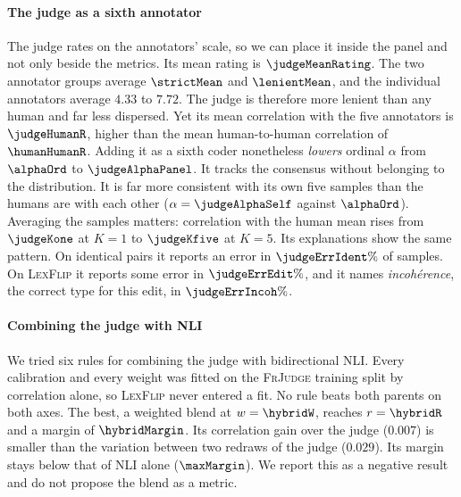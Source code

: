 \documentclass{BVP_JCLLT}
\newcommand{\rev}[1]{#1}
\newcommand{\rev}[1]{{\color{revcol}#1}}
\begin{document}
{\paragraph{The judge as a sixth annotator}
The judge rates on the annotators' scale, so we can place it inside the panel
and not only beside the metrics. Its mean rating is $\judgeMeanRating$. \rev{The two annotator groups average $\strictMean$ and
$\lenientMean$, and the individual annotators average $4.33$ to $7.72$. The
judge is therefore more lenient than any human and far less dispersed.} Yet its mean correlation with the five
annotators is $\judgeHumanR$, higher than the mean human-to-human correlation
of $\humanHumanR$. Adding it as a sixth coder nonetheless \emph{lowers} ordinal
$\alpha$ from $\alphaOrd$ to $\judgeAlphaPanel$. It tracks the consensus without
belonging to the distribution. It is far more consistent with its own five
samples than the humans are with each other ($\alpha=\judgeAlphaSelf$ against
$\alphaOrd$). Averaging the samples matters: correlation with the human mean
rises from $\judgeKone$ at $K=1$ to $\judgeKfive$ at $K=5$. Its explanations
show the same pattern. On identical pairs it reports an error in
$\judgeErrIdent\%$ of samples. On \textsc{LexFlip} it reports some error in
$\judgeErrEdit\%$, and it names \emph{incoh\'erence}, the correct type for this
edit, in $\judgeErrIncoh\%$.

\paragraph{Combining the judge with NLI}
We tried six rules for combining the judge with bidirectional NLI. Every
calibration and every weight was fitted on the \textsc{FrJudge} training split
by correlation alone, so \textsc{LexFlip} never entered a fit. No rule beats
both parents on both axes. The best, a weighted blend at $w=\hybridW$, reaches
$r=\hybridR$ and a margin of $\hybridMargin$. Its correlation gain over the
judge ($0.007$) is smaller than the variation between two redraws of the judge
($0.029$). Its margin stays below that of NLI alone ($\maxMargin$). We report
this as a negative result and do not propose the blend as a metric.}

\begin{table}
\centering
\caption{\rev{The judge prompts. The headline configuration uses v1. Each pair
is sent in its own request, $K$ times, and the integer score is read from the
JSON reply.}}\label{tab:prompts}
\scriptsize
\rev{}
\end{table}
\end{document}
